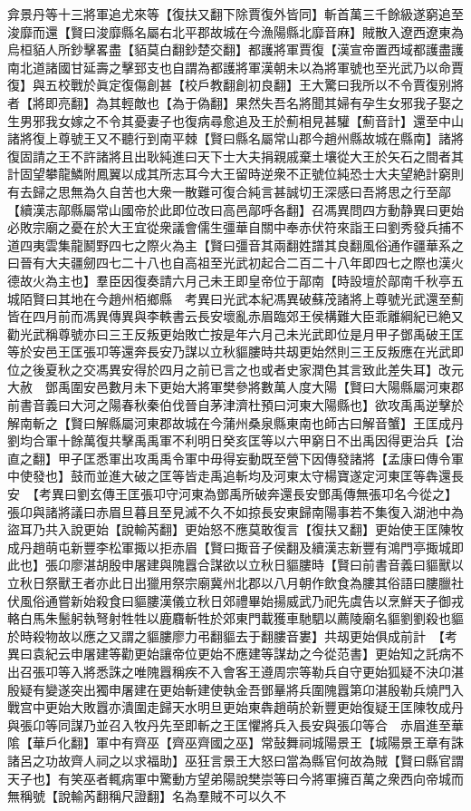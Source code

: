 弇景丹等十三將軍追尤來等【復扶又翻下除賈復外皆同】斬首萬三千餘級遂窮追至浚靡而還【賢曰浚靡縣名屬右北平郡故城在今漁陽縣北靡音麻】賊散入遼西遼東為烏桓貊人所鈔擊畧盡【貊莫白翻鈔楚交翻】都護將軍賈復【漢宣帝置西域都護盡護南北道諸國甘延壽之擊郅支也自謂為都護將軍漢朝未以為將軍號也至光武乃以命賈復】與五校戰於眞定復傷創甚【校戶教翻創初良翻】王大驚曰我所以不令賈復别將者【將即亮翻】為其輕敵也【為于偽翻】果然失吾名將聞其婦有孕生女邪我子娶之生男邪我女嫁之不令其憂妻子也復病尋愈追及王於薊相見甚驩【薊音計】還至中山諸將復上尊號王又不聽行到南平棘【賢曰縣名屬常山郡今趙州縣故城在縣南】諸將復固請之王不許諸將且出耿純進曰天下士大夫捐親戚棄土壤從大王於矢石之間者其計固望攀龍鱗附鳳翼以成其所志耳今大王留時逆衆不正號位純恐士大夫望絶計窮則有去歸之思無為久自苦也大衆一散難可復合純言甚誠切王深感曰吾將思之行至鄗【續漢志鄗縣屬常山國帝於此即位改曰高邑鄗呼各翻】召馮異問四方動静異曰更始必敗宗廟之憂在於大王宜從衆議會儒生彊華自關中奉赤伏符來詣王曰劉秀發兵捕不道四夷雲集龍鬭野四七之際火為主【賢曰彊音其兩翻姓譜其良翻風俗通作疆華系之曰晉有大夫疆劒四七二十八也自高祖至光武初起合二百二十八年即四七之際也漢火德故火為主也】羣臣因復奏請六月己未王即皇帝位于鄗南【時設壇於鄗南千秋亭五城陌賢曰其地在今趙州栢鄉縣　考異曰光武本紀馮異破蘇茂諸將上尊號光武還至薊皆在四月前而馮異傳異與李軼書云長安壞亂赤眉臨郊王侯構難大臣乖離綱紀已絶又勸光武稱尊號亦曰三王反叛更始敗亡按是年六月己未光武即位是月甲子鄧禹破王匡等於安邑王匡張卭等還奔長安乃謀以立秋貙膢時共刼更始然則三王反叛應在光武即位之後夏秋之交馮異安得於四月之前已言之也或者史家潤色其言致此差失耳】改元大赦　鄧禹圍安邑數月未下更始大將軍樊參將數萬人度大陽【賢曰大陽縣屬河東郡前書音義曰大河之陽春秋秦伯伐晉自茅津濟杜預曰河東大陽縣也】欲攻禹禹逆擊於解南斬之【賢曰解縣屬河東郡故城在今蒲州桑泉縣東南也師古曰解音蟹】王匡成丹劉均合軍十餘萬復共擊禹禹軍不利明日癸亥匡等以六甲窮日不出禹因得更治兵【治直之翻】甲子匡悉軍出攻禹禹令軍中毋得妄動既至營下因傳發諸將【孟康曰傳令軍中使發也】鼓而並進大破之匡等皆走禹追斬均及河東太守楊寶遂定河東匡等犇還長安　【考異曰劉玄傳王匡張卭守河東為鄧禹所破奔還長安鄧禹傳無張卭名今從之】張卬與諸將議曰赤眉旦暮且至見滅不久不如掠長安東歸南陽事若不集復入湖池中為盜耳乃共入說更始【說輸芮翻】更始怒不應莫敢復言【復扶又翻】更始使王匡陳牧成丹趙萌屯新豐李松軍掫以拒赤眉【賢曰掫音子侯翻及續漢志新豐有鴻門亭掫城即此也】張卬廖湛胡殷申屠建與隗囂合謀欲以立秋日貙膢時【賢曰前書音義曰貙獸以立秋日祭獸王者亦此日出獵用祭宗廟冀州北郡以八月朝作飲食為膢其俗語曰膢臘社伏風俗通嘗新始殺食曰貙膢漢儀立秋日郊禮畢始揚威武乃祀先虞告以烹鮮天子御戎輅白馬朱鬛躬執弩射牲牲以鹿麛斬牲於郊東門載獲車馳駟以薦陵廟名貙劉劉殺也貙於時殺物故以應之又謂之貙膢廖力弔翻貙去于翻膢音婁】共刼更始俱成前計　【考異曰袁紀云申屠建等勸更始讓帝位更始不應建等謀劫之今從范書】更始知之託病不出召張卭等入將悉誅之唯隗囂稱疾不入會客王遵周宗等勒兵自守更始狐疑不決卬湛殷疑有變遂突出獨申屠建在更始斬建使執金吾鄧曅將兵圍隗囂第卬湛殷勒兵燒門入戰宫中更始大敗囂亦潰圍走歸天水明旦更始東犇趙萌於新豐更始復疑王匡陳牧成丹與張卬等同謀乃並召入牧丹先至即斬之王匡懼將兵入長安與張卬等合　赤眉進至華隂【華戶化翻】軍中有齊巫【齊巫齊國之巫】常鼔舞祠城陽景王【城陽景王章有誅諸呂之功故齊人祠之以求福助】巫狂言景王大怒曰當為縣官何故為賊【賢曰縣官謂天子也】有笑巫者輒病軍中驚動方望弟陽說樊崇等曰今將軍擁百萬之衆西向帝城而無稱號【說輸芮翻稱尺證翻】名為羣賊不可以久不